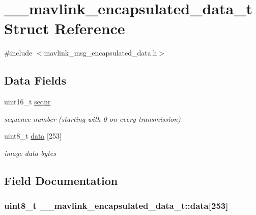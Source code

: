 \hypertarget{struct____mavlink__encapsulated__data__t}{\section{\+\_\+\+\_\+mavlink\+\_\+encapsulated\+\_\+data\+\_\+t Struct Reference}
\label{struct____mavlink__encapsulated__data__t}
}


{\ttfamily \#include $<$mavlink\+\_\+msg\+\_\+encapsulated\+\_\+data.\+h$>$}

\subsection*{Data Fields}
\begin{DoxyCompactItemize}
\item 
uint16\+\_\+t \hyperlink{struct____mavlink__encapsulated__data__t_a03045c39478624bab39a02bbf10052f0}{seqnr}
\begin{DoxyCompactList}\small\item\em sequence number (starting with 0 on every transmission) \end{DoxyCompactList}\item 
uint8\+\_\+t \hyperlink{struct____mavlink__encapsulated__data__t_a4d349302b7a1efac0a2bea9275e4a03f}{data} \mbox{[}253\mbox{]}
\begin{DoxyCompactList}\small\item\em image data bytes \end{DoxyCompactList}\end{DoxyCompactItemize}


\subsection{Field Documentation}
\hypertarget{struct____mavlink__encapsulated__data__t_a4d349302b7a1efac0a2bea9275e4a03f}{
\subsubsection[{data}]{\setlength{\rightskip}{0pt plus 5cm}uint8\+\_\+t \+\_\+\+\_\+mavlink\+\_\+encapsulated\+\_\+data\+\_\+t\+::data\mbox{[}253\mbox{]}}}\label{struct____mavlink__encapsulated__data__t_a4d349302b7a1efac0a2bea9275e4a03f}


